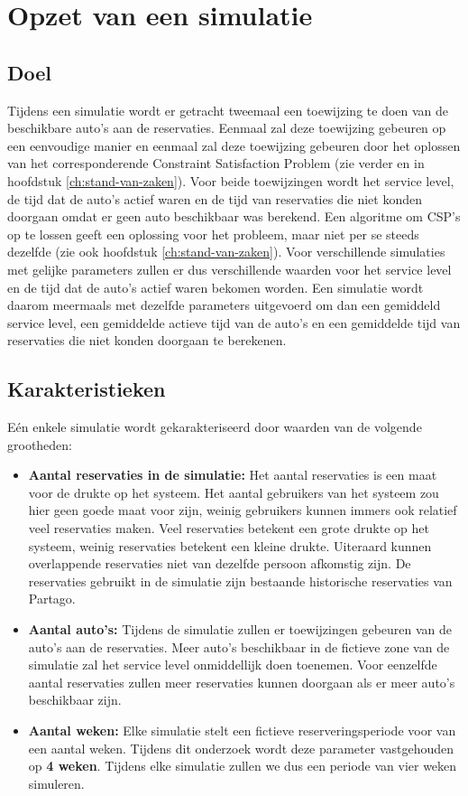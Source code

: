 \section{Opzet van een simulatie} \label{opzet-simulatie}
\subsection{Doel}
Tijdens een simulatie wordt er getracht tweemaal een toewijzing te doen van de beschikbare auto's aan de reservaties. Eenmaal zal deze toewijzing gebeuren op een eenvoudige manier en eenmaal zal deze toewijzing gebeuren door het oplossen van het corresponderende Constraint Satisfaction Problem (zie verder en in hoofdstuk \ref{ch:stand-van-zaken}). Voor beide toewijzingen wordt het service level, de tijd dat de auto's actief waren en de tijd van reservaties die niet konden doorgaan omdat er geen auto beschikbaar was berekend. Een algoritme om CSP's op te lossen geeft een oplossing voor het probleem, maar niet per se steeds dezelfde (zie ook hoofdstuk \ref{ch:stand-van-zaken}). Voor verschillende simulaties met gelijke parameters zullen er dus verschillende waarden voor het service level en de tijd dat de auto's actief waren bekomen worden. Een simulatie wordt daarom meermaals met dezelfde parameters uitgevoerd om dan een gemiddeld service level, een gemiddelde actieve tijd van de auto's en een gemiddelde tijd van reservaties die niet konden doorgaan te berekenen.

\subsection{Karakteristieken}
Eén enkele simulatie wordt gekarakteriseerd door waarden van de volgende grootheden:
\begin{itemize}
	\item \textbf{Aantal reservaties in de simulatie:}
	Het aantal reservaties is een maat voor de drukte op het systeem. Het aantal gebruikers van het systeem zou hier geen goede maat voor zijn, weinig gebruikers kunnen immers ook relatief veel reservaties maken. Veel reservaties betekent een grote drukte op het systeem, weinig reservaties betekent een kleine drukte. Uiteraard kunnen overlappende reservaties niet van dezelfde persoon afkomstig zijn. De reservaties gebruikt in de simulatie zijn bestaande historische reservaties van Partago.
	\item \textbf{Aantal auto's:}
	Tijdens de simulatie zullen er toewijzingen gebeuren van de auto's aan de reservaties. Meer auto's beschikbaar in de fictieve zone van de simulatie zal het service level onmiddellijk doen toenemen. Voor eenzelfde aantal reservaties zullen meer reservaties kunnen doorgaan als er meer auto's beschikbaar zijn. 
	\item \textbf{Aantal weken:}
	Elke simulatie stelt een fictieve reserveringsperiode voor van een aantal weken. Tijdens dit onderzoek wordt deze parameter vastgehouden op \textbf{4 weken}. Tijdens elke simulatie zullen we dus een periode van vier weken simuleren. 
\end{itemize} 

